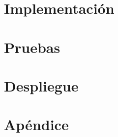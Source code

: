 \documentclass[a4paper, 11pt, showtrims]{memoir}
\begin{document}
\chapter{Implementación} \label{ch:implementacion}

\cleardoublepage

\chapter{Pruebas} \label{ch:pruebas}

\cleardoublepage

\chapter{Despliegue} \label{ch:despliegue}

\cleardoublepage


\backmatter
\appendix

\chapter{Apéndice} \label{ch:apendice}





\end{document}
